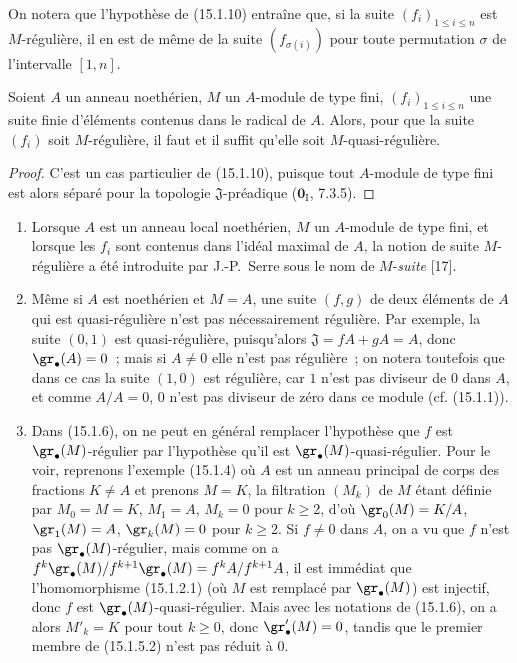 On notera que l'hypothèse de (15.1.10) entraîne que, si la suite
$(f_i)_{1\leq i\leq n}$ est $M$-régulière, il en est de même de la suite
$(f_{\sigma(i)})$ pour toute permutation $\sigma$ de l'intervalle $[1,n]$.

\begin{corollary}[15.1.11]
\label{0.15.1.11-fr}
Soient $A$ un anneau noethérien, $M$ un $A$-module de type fini,
$(f_i)_{1\leq i\leq n}$ une suite finie d'éléments contenus dans le \textup{radical} de
$A$. Alors, pour que la suite $(f_i)$ soit $M$-régulière, il faut et il suffit
qu'elle soit $M$-quasi-régulière.
\end{corollary}

\begin{proof}
C'est un cas particulier de (15.1.10), puisque tout $A$-module de type fini
est alors séparé pour la topologie $\mathfrak{J}$-préadique
($\mathbf{0}_{\mathrm I}$, 7.3.5).
\end{proof}

\begin{remarks}[15.1.12]
\label{0.15.1.12-fr}
\mbox{}
\begin{enumerate}
  \item[(i)] Lorsque $A$ est un anneau local noethérien, $M$ un $A$-module de
  type fini, et lorsque les $f_i$ sont contenus dans l'idéal maximal de $A$,
  la notion de suite $M$-régulière a été introduite par J.-P.~Serre sous le
  nom de $M$-\emph{suite} [17].
  \item[(ii)] Même si $A$ est noethérien et $M=A$, une suite $(f,g)$ de deux
  éléments de $A$ qui est quasi-régulière n'est pas nécessairement régulière.
  Par exemple, la suite $(0,1)$ est quasi-régulière, puisqu'alors
  $\mathfrak{J}=fA+gA=A$, donc $\gr_\bullet(A)=0$~; mais si $A\neq0$ elle
  n'est pas régulière~; on notera toutefois que dans ce cas la suite $(1,0)$
  est régulière, car $1$ n'est pas diviseur de $0$ dans $A$, et comme
  $A/A=0$, $0$ n'est pas diviseur de zéro dans ce module (cf. (15.1.1)).
  \item[(iii)]
  Dans (15.1.6), on ne peut en général remplacer l'hypothèse que $f$ est
  $\gr_\bullet(M)$-régulier par l'hypothèse qu'il est
  $\gr_\bullet(M)$-quasi-régulier. Pour le voir, reprenons l'exemple (15.1.4)
  où $A$ est un anneau principal de corps des fractions $K\neq A$ et prenons
  $M=K$, la filtration $(M_k)$ de $M$ étant définie par
  $M_0=M=K$, $M_1=A$, $M_k=0$ pour $k\geq2$, d'où
  $\gr_0(M)=K/A$, $\gr_1(M)=A$, $\gr_k(M)=0$ pour $k\geq2$. Si $f\neq0$ dans
  $A$, on a vu que $f$ n'est pas $\gr_\bullet(M)$-régulier, mais comme on a
  $f^k\gr_\bullet(M)/f^{k+1}\gr_\bullet(M)=f^kA/f^{k+1}A$,
  il est immédiat que l'homomorphisme (15.1.2.1) (où $M$ est remplacé par
  $\gr_\bullet(M)$) est injectif, donc $f$ est
  $\gr_\bullet(M)$-quasi-régulier. Mais avec les notations de (15.1.6), on a
  alors $M'_k=K$ pour tout $k\geq0$, donc $\gr'_\bullet(M)=0$, tandis que le
  premier membre de (15.1.5.2) n'est pas réduit à $0$.
\end{enumerate}
\end{remarks}

